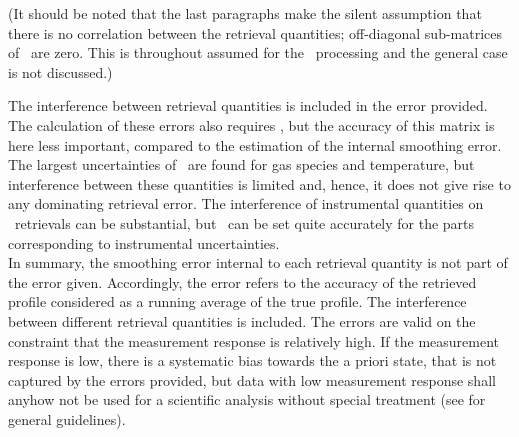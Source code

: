 (It should be noted that the last paragraphs make the silent assumption that
there is no correlation between the retrieval quantities; off-diagonal
sub-matrices of \aCvrMtr{\VctStl{\SttVct}}\ are zero. This is throughout
assumed for the \SMR\ processing and the general case is not discussed.)

The interference between retrieval quantities is included in the error
provided. The calculation of these errors also requires \aCvrMtr{\SttVct}, but
the accuracy of this matrix is here less important, compared to the estimation
of the internal smoothing error. The largest uncertainties of
\aCvrMtr{\SttVct}\ are found for gas species and temperature, but interference
between these quantities is limited and, hence, it does not give rise to any
dominating retrieval error. The interference of instrumental quantities on
\VMR\ retrievals can be substantial, but \aCvrMtr{\SttVct}\ can be
set quite accurately for the parts corresponding to instrumental uncertainties.\\

\noindent
In summary, the smoothing error internal to each retrieval quantity is not part
of the error given. Accordingly, the error refers to the accuracy of the
retrieved profile considered as a running average of the true profile. The
interference between different retrieval quantities is included. The errors are
valid on the constraint that the measurement response is relatively high. If
the measurement response is low, there is a systematic bias towards the a
priori state, that is not captured by the errors provided, but data with
low measurement response shall anyhow not be used for a scientific analysis
without special treatment (see \citet{rodgers2003intercomparison} for general
guidelines).



